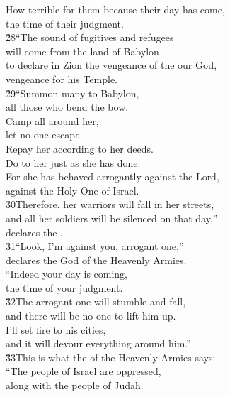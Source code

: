 \begin{poetry}
\poeml How terrible for them because their day has come, \\
\poemll    the time of their judgment. \\
\poeml \v{28}``The sound of fugitives and refugees \\
\poemll    will come from the land of Babylon \\
\poeml to declare in Zion the vengeance of the  our God, \\
\poemll    vengeance for his Temple. \\
\poeml \v{29}``Summon many to Babylon, \\
\poemll    all those who bend the bow. \\
\poeml Camp all around her, \\
\poemll    let no one escape. \\
\poeml Repay her according to her deeds. \\
\poemll    Do to her just as she has done. \\
\poeml For she has behaved arrogantly against the Lord, \\
\poemll    against the Holy One of Israel. \\
\poeml \v{30}Therefore, her warriors will fall in her streets, \\
\poemll    and all her soldiers will be silenced on that day,'' \\
\poemlll       declares the . \\
\poeml \v{31}``Look, I'm against you, arrogant one,'' \\
\poemll    declares the  God of the Heavenly Armies. \\
\poeml ``Indeed your day is coming, \\
\poemll    the time of your judgment. \\
\poeml \v{32}The arrogant one will stumble and fall, \\
\poemll    and there will be no one to lift him up. \\
\poeml I'll set fire to his cities, \\
\poemll    and it will devour everything around him.'' \\
\poeml \v{33}This is what the  of the Heavenly Armies says: \\
\poeml ``The people of Israel are oppressed, \\
\poemll    along with the people of Judah. \\

\end{poetry}
